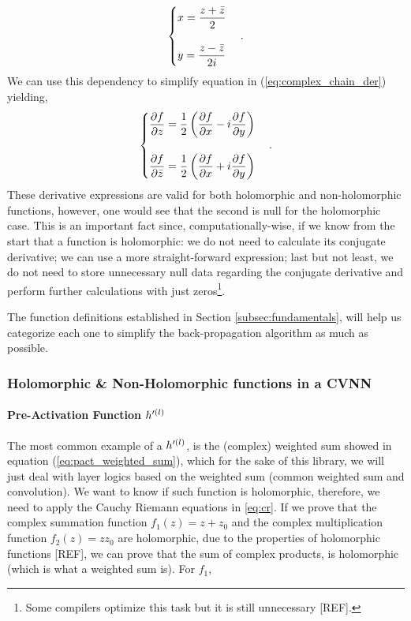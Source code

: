 \begin{equation}
	\begin{cases}
		x = \dfrac{z + \bar{z}}{2} \\
		\\
		y = \dfrac{z - \bar{z}}{2i}
	\end{cases}.
\end{equation}
We can use this dependency to simplify equation in (\ref{eq:complex_chain_der}) yielding,
\begin{equation}
	\begin{cases}
		\dfrac{\partial f}{\partial z} = \dfrac{1}{2} \left( \dfrac{\partial f}{\partial x} - i\dfrac{\partial f}{\partial y} \right) \\
		\\
		\dfrac{\partial f}{\partial \bar{z}} = \dfrac{1}{2} \left( \dfrac{\partial f}{\partial x} + i\dfrac{\partial f}{\partial y} \right)
	\end{cases}.
	\label{eq:complex_chain_der_simp}
\end{equation}
These derivative expressions are valid for both holomorphic and non-holomorphic functions, however, one would see that the second is null for the holomorphic case. This is an important fact since, computationally-wise, if we know from the start that a function is holomorphic: we do not need to calculate its conjugate derivative; we can use a more straight-forward expression; last but not least, we do not need to store unnecessary null data regarding the conjugate derivative and perform further calculations with just zeros\footnote{Some compilers optimize this task but it is still unnecessary [REF].}.

The function definitions established in Section \ref{subsec:fundamentals}, will help us categorize each one to simplify the back-propagation algorithm as much as possible.

\subsubsection{Holomorphic \& Non-Holomorphic functions in a \gls{CVNN}}
\label{subsubsec:holo_non_holo}
\paragraph{Pre-Activation Function $ h'^{(l)} $} 
The most common example of a $ h'^{(l)} $, is the (complex) weighted sum showed in equation (\ref{eq:pact_weighted_sum}), which for the sake of this library, we will just deal with layer logics based on the weighted sum (common weighted sum and convolution). We want to know if such function is holomorphic, therefore, we need to apply the Cauchy Riemann equations in \ref{eq:cr}. If we prove that the complex summation function $ f_1(z) = z + z_0 $ and the complex multiplication function $ f_2(z) = z z_0 $ are holomorphic, due to the properties of holomorphic functions [REF], we can prove that the sum of complex products, is holomorphic (which is what a weighted sum is). For $ f_1 $,

